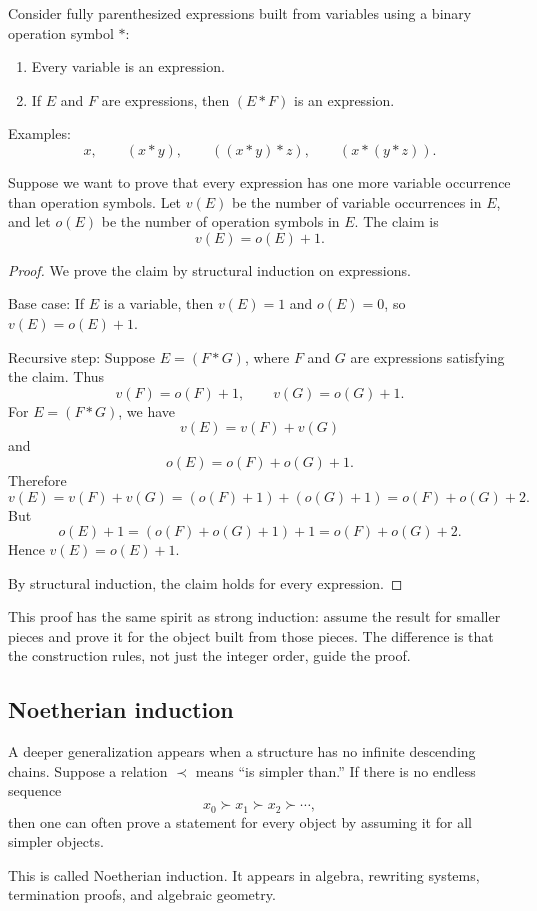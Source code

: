 Consider fully parenthesized expressions built from variables using a binary operation symbol $*$:

\begin{enumerate}
\item Every variable is an expression.
\item If $E$ and $F$ are expressions, then $(E*F)$ is an expression.
\end{enumerate}

Examples:
\[
x,\qquad (x*y),\qquad ((x*y)*z),\qquad (x*(y*z)).
\]

Suppose we want to prove that every expression has one more variable occurrence than operation symbols. Let $v(E)$ be the number of variable occurrences in $E$, and let $o(E)$ be the number of operation symbols in $E$. The claim is
\[
v(E)=o(E)+1.
\]

\begin{proof}
We prove the claim by structural induction on expressions.

Base case: If $E$ is a variable, then $v(E)=1$ and $o(E)=0$, so $v(E)=o(E)+1$.

Recursive step: Suppose $E=(F*G)$, where $F$ and $G$ are expressions satisfying the claim. Thus
\[
v(F)=o(F)+1,\qquad v(G)=o(G)+1.
\]
For $E=(F*G)$, we have
\[
v(E)=v(F)+v(G)
\]
and
\[
o(E)=o(F)+o(G)+1.
\]
Therefore
\[
v(E)=v(F)+v(G)=(o(F)+1)+(o(G)+1)=o(F)+o(G)+2.
\]
But
\[
o(E)+1=(o(F)+o(G)+1)+1=o(F)+o(G)+2.
\]
Hence $v(E)=o(E)+1$.

By structural induction, the claim holds for every expression.
\end{proof}

This proof has the same spirit as strong induction: assume the result for smaller pieces and prove it for the object built from those pieces. The difference is that the construction rules, not just the integer order, guide the proof.

\subsection{Noetherian induction}

A deeper generalization appears when a structure has no infinite descending chains. Suppose a relation $\prec$ means ``is simpler than.'' If there is no endless sequence
\[
x_0\succ x_1\succ x_2\succ\cdots,
\]
then one can often prove a statement for every object by assuming it for all simpler objects.

This is called Noetherian induction. It appears in algebra, rewriting systems, termination proofs, and algebraic geometry.

